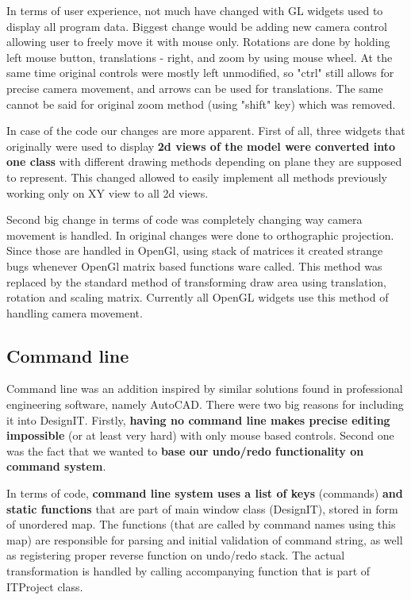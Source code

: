 \documentclass[a4paper, 11pt, article]{report}
\begin{document}
In terms of user experience, not much have changed with GL widgets used to display all program data. Biggest change would be adding new camera control allowing user to freely move it with mouse only. Rotations are done by holding left mouse button, translations - right, and zoom by using mouse wheel. At the same time original controls were mostly left unmodified, so "ctrl" still allows for precise camera movement, and arrows can be used for translations. The same cannot be said for original zoom method (using "shift" key) which was removed.

In case of the code our changes are more apparent. First of all, three widgets that originally were used to display \textbf{2d views of the model were converted into one class} with different drawing methods depending on plane they are supposed to represent. This changed allowed to easily implement all methods previously working only on XY view to all 2d views. 

Second big change in terms of code was completely changing way camera movement is handled. In original changes were done to orthographic projection. Since those are handled in OpenGl, using stack of matrices it created strange bugs whenever OpenGl matrix based functions ware called. This method was replaced by the standard method of transforming draw area using translation, rotation and scaling matrix. Currently all OpenGL widgets use this method of handling camera movement.

\subsection{Command line}

Command line was an addition inspired by similar solutions found in professional engineering software, namely AutoCAD. There were two big reasons for including it into DesignIT. Firstly, \textbf{having no command line makes precise editing impossible} (or at least very hard) with only mouse based controls. Second one was the fact that we wanted to \textbf{base our undo/redo functionality on command system}.

In terms of code, \textbf{command line system uses a list of keys} (commands) \textbf{and static functions} that are part of main window class (DesignIT), stored in form of unordered map. The functions (that are called by command names using this map) are responsible for parsing and initial validation of command string, as well as registering proper reverse function on undo/redo stack. The actual transformation is handled by calling accompanying function that is part of ITProject class.
\end{document}
